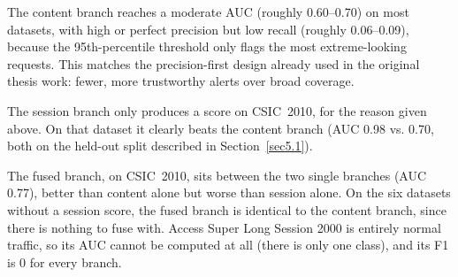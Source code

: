 \documentclass[futureinternet,article,submit,moreauthors]{Definitions/mdpi}
\begin{document}
The content branch reaches a moderate AUC (roughly 0.60--0.70) on most datasets, with high or perfect precision but low recall (roughly 0.06--0.09), because the 95th-percentile threshold only flags the most extreme-looking requests. This matches the precision-first design already used in the original thesis work: fewer, more trustworthy alerts over broad coverage.

The session branch only produces a score on CSIC~2010, for the reason given above. On that dataset it clearly beats the content branch (AUC 0.98 vs. 0.70, both on the held-out split described in Section~\ref{sec5.1}).

The fused branch, on CSIC~2010, sits between the two single branches (AUC 0.77), better than content alone but worse than session alone. On the six datasets without a session score, the fused branch is identical to the content branch, since there is nothing to fuse with. Access Super Long Session 2000 is entirely normal traffic, so its AUC cannot be computed at all (there is only one class), and its F1 is 0 for every branch.
\end{document}
